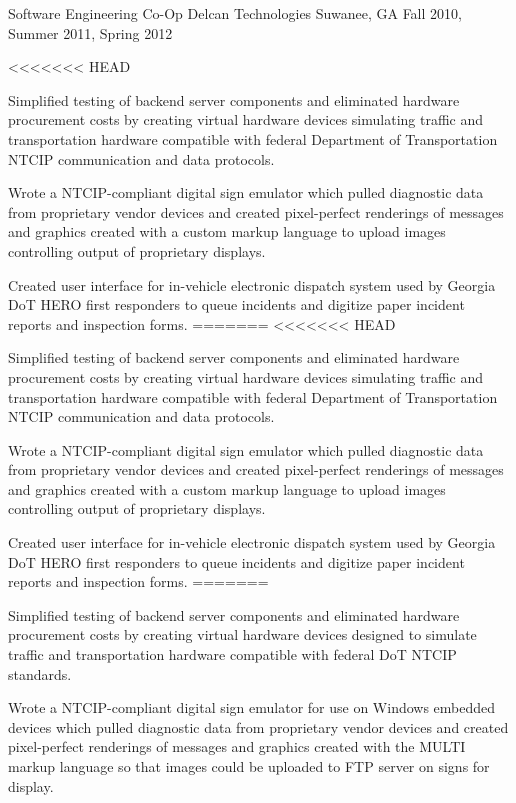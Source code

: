 \begin{cventries}
  \cventry
    {Software Engineering Co-Op} %
    {Delcan Technologies} %
    {Suwanee, GA} %
    {Fall 2010, Summer 2011, Spring 2012} %
    {
      \begin{cvitems} %
<<<<<<< HEAD
        \item {Simplified testing of backend server components and eliminated hardware procurement costs by creating virtual hardware devices simulating traffic and transportation hardware compatible with federal Department of Transportation NTCIP communication and data protocols.}
        \item {Wrote a NTCIP-compliant digital sign emulator which pulled diagnostic data from proprietary vendor devices and created pixel-perfect renderings of messages and graphics created with a custom markup language to upload images controlling output of proprietary displays.}
		\item {Created user interface for in-vehicle electronic dispatch system used by Georgia DoT HERO first responders to queue incidents and digitize paper incident reports and inspection forms.}
=======
<<<<<<< HEAD
        \item {Simplified testing of backend server components and eliminated hardware procurement costs by creating virtual hardware devices simulating traffic and transportation hardware compatible with federal Department of Transportation NTCIP communication and data protocols.}
        \item {Wrote a NTCIP-compliant digital sign emulator which pulled diagnostic data from proprietary vendor devices and created pixel-perfect renderings of messages and graphics created with a custom markup language to upload images controlling output of proprietary displays.}
		\item {Created user interface for in-vehicle electronic dispatch system used by Georgia DoT HERO first responders to queue incidents and digitize paper incident reports and inspection forms.}
=======
        \item {Simplified testing of backend server components and eliminated hardware procurement costs by creating virtual hardware devices designed to simulate traffic and transportation hardware compatible with federal DoT NTCIP standards.}
        \item {Wrote a NTCIP-compliant digital sign emulator for use on Windows embedded devices which pulled diagnostic data from proprietary vendor devices and created pixel-perfect renderings of messages and graphics created with the MULTI markup language so that images could be uploaded to FTP server on signs for display.}

\end{cvitems}}
\end{cventries}

